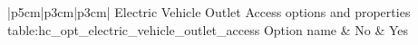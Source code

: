 \begin{customLongTable}{ |p{5cm}|p{3cm}|p{3cm}| }
{Electric Vehicle Outlet Access options and properties} {table:hc_opt_electric_vehicle_outlet_access}
{Option name & No & Yes}
\endhead
\hline
\end{customLongTable}
